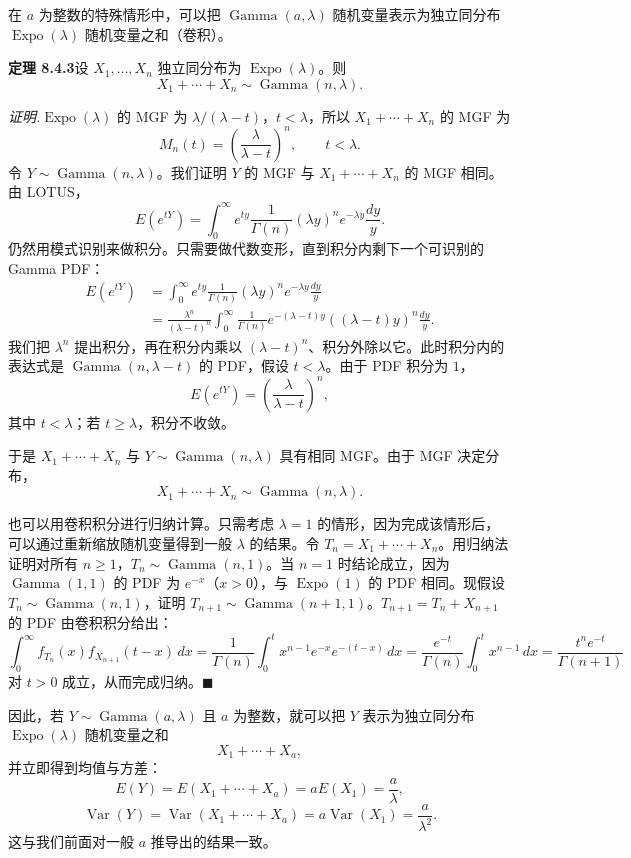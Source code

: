 \documentclass[UTF8,12pt,a4paper,fontset=fandol]{ctexart}
\begin{document}
在 $a$ 为整数的特殊情形中，可以把 $\operatorname{Gamma}(a,\lambda)$ 随机变量表示为独立同分布 $\operatorname{Expo}(\lambda)$ 随机变量之和（卷积）。

\noindent\textbf{定理 8.4.3}\quad 设 $X_1,\ldots,X_n$ 独立同分布为 $\operatorname{Expo}(\lambda)$。则
\[
  X_1+\cdots+X_n\sim\operatorname{Gamma}(n,\lambda).
\]

\noindent\textit{证明.}\quad $\operatorname{Expo}(\lambda)$ 的 MGF 为 $\lambda/(\lambda-t)$，$t<\lambda$，所以 $X_1+\cdots+X_n$ 的 MGF 为
\[
  M_n(t)=\left(\frac{\lambda}{\lambda-t}\right)^n,\qquad t<\lambda.
\]
令 $Y\sim\operatorname{Gamma}(n,\lambda)$。我们证明 $Y$ 的 MGF 与 $X_1+\cdots+X_n$ 的 MGF 相同。由 LOTUS，
\[
  E(e^{tY})=\int_0^\infty e^{ty}\frac{1}{\Gamma(n)}(\lambda y)^n e^{-\lambda y}\frac{dy}{y}.
\]
仍然用模式识别来做积分。只需要做代数变形，直到积分内剩下一个可识别的 Gamma PDF：
\[
\begin{aligned}
  E(e^{tY})
  &=\int_0^\infty e^{ty}\frac{1}{\Gamma(n)}(\lambda y)^n e^{-\lambda y}\frac{dy}{y}\\
  &=\frac{\lambda^n}{(\lambda-t)^n}
    \int_0^\infty \frac1{\Gamma(n)}e^{-(\lambda-t)y}((\lambda-t)y)^n\frac{dy}{y}.
\end{aligned}
\]
我们把 $\lambda^n$ 提出积分，再在积分内乘以 $(\lambda-t)^n$、积分外除以它。此时积分内的表达式是 $\operatorname{Gamma}(n,\lambda-t)$ 的 PDF，假设 $t<\lambda$。由于 PDF 积分为 $1$，
\[
  E(e^{tY})=\left(\frac{\lambda}{\lambda-t}\right)^n,
\]
其中 $t<\lambda$；若 $t\ge\lambda$，积分不收敛。

于是 $X_1+\cdots+X_n$ 与 $Y\sim\operatorname{Gamma}(n,\lambda)$ 具有相同 MGF。由于 MGF 决定分布，
\[
  X_1+\cdots+X_n\sim\operatorname{Gamma}(n,\lambda).
\]

也可以用卷积积分进行归纳计算。只需考虑 $\lambda=1$ 的情形，因为完成该情形后，可以通过重新缩放随机变量得到一般 $\lambda$ 的结果。令 $T_n=X_1+\cdots+X_n$。用归纳法证明对所有 $n\ge1$，$T_n\sim\operatorname{Gamma}(n,1)$。当 $n=1$ 时结论成立，因为 $\operatorname{Gamma}(1,1)$ 的 PDF 为 $e^{-x}$（$x>0$），与 $\operatorname{Expo}(1)$ 的 PDF 相同。现假设 $T_n\sim\operatorname{Gamma}(n,1)$，证明 $T_{n+1}\sim\operatorname{Gamma}(n+1,1)$。$T_{n+1}=T_n+X_{n+1}$ 的 PDF 由卷积积分给出：
\[
  \int_0^\infty f_{T_n}(x)f_{X_{n+1}}(t-x)\,dx
  =
  \frac{1}{\Gamma(n)}\int_0^t x^{n-1}e^{-x}e^{-(t-x)}\,dx
  =
  \frac{e^{-t}}{\Gamma(n)}\int_0^t x^{n-1}\,dx
  =
  \frac{t^n e^{-t}}{\Gamma(n+1)}
\]
对 $t>0$ 成立，从而完成归纳。$\blacksquare$

因此，若 $Y\sim\operatorname{Gamma}(a,\lambda)$ 且 $a$ 为整数，就可以把 $Y$ 表示为独立同分布 $\operatorname{Expo}(\lambda)$ 随机变量之和
\[
  X_1+\cdots+X_a,
\]
并立即得到均值与方差：
\[
  E(Y)=E(X_1+\cdots+X_a)=aE(X_1)=\frac{a}{\lambda},
\]
\[
  \operatorname{Var}(Y)=\operatorname{Var}(X_1+\cdots+X_a)=a\operatorname{Var}(X_1)=\frac{a}{\lambda^2}.
\]
这与我们前面对一般 $a$ 推导出的结果一致。
\end{document}
